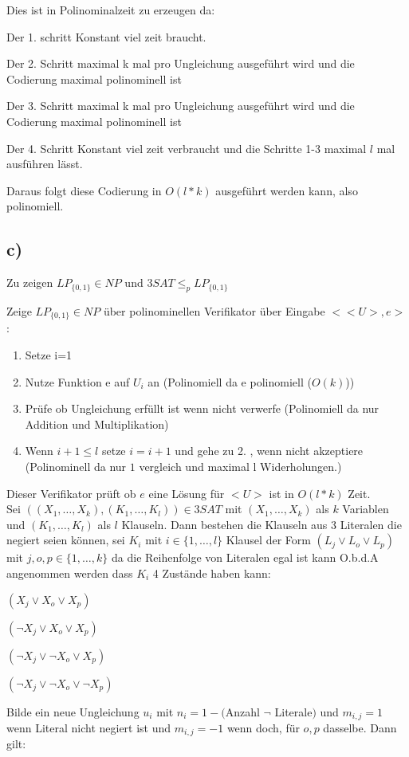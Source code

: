 Dies ist in Polinominalzeit zu erzeugen da:
\begin{list}{-}{}
\item Der 1. schritt Konstant viel zeit braucht.
\item Der 2. Schritt maximal k mal pro Ungleichung ausgeführt wird und die Codierung maximal polinominell ist 
\item Der 3. Schritt maximal k mal pro Ungleichung ausgeführt wird und die Codierung maximal polinominell ist 
\item Der 4. Schritt Konstant viel zeit verbraucht und die Schritte 1-3 maximal $l$ mal ausführen lässt.

\end{list}

 Daraus folgt diese Codierung in $O(l*k)$ ausgeführt werden kann, also polinomiell.
 
\subsection*{c)} 
Zu zeigen $LP_{\{0,1\}} \in NP$ und $3SAT \leq_p LP_{\{0,1\}}$

Zeige $LP_{\{0,1\}} \in NP$ über polinominellen Verifikator über Eingabe $<<U>,e>$:
\begin{enumerate}
\item Setze i=1
\item Nutze Funktion e auf $U_i$ an (Polinomiell da e polinomiell ($O(k)$))
\item Prüfe ob Ungleichung erfüllt ist wenn nicht verwerfe (Polinomiell da nur Addition und Multiplikation)
\item Wenn $i+1 \leq l$ setze $i=i+1$ und gehe zu 2. , wenn nicht akzeptiere (Polinominell da nur $1$ vergleich und maximal l Widerholungen.) 
\end{enumerate}
Dieser Verifikator prüft ob $e$ eine Lösung für $<U>$ ist in $O(l*k)$ Zeit.\\

Sei $((X_1,\ldots ,X_k),(K_1, \ldots , K_l)) \in 3SAT$ mit $(X_1,\ldots ,X_k)$ als $k$ Variablen und $(K_1, \ldots , K_l)$ als $l$ Klauseln. Dann bestehen die Klauseln aus 3 Literalen die negiert seien können, sei $K_i$ mit $i \in \{ 1, \ldots , l\}$ Klausel der Form $(L_j \vee L_o \vee L_p)$ mit $j,o,p \in \{ 1, \ldots , k\}$ da die Reihenfolge von Literalen egal ist kann O.b.d.A angenommen werden dass $K_i$ 4 Zustände haben kann:
\begin{list}{}{}
\item $(X_j \vee X_o \vee X_p)$
\item $( \neg X_j \vee X_o \vee X_p)$
\item $(\neg X_j \vee \neg X_o \vee X_p)$
\item $( \neg X_j \vee \neg X_o \vee \neg X_p)$
\end{list}
Bilde ein neue Ungleichung $u_i$ mit $n_i=1-($Anzahl $\neg$ Literale$)$ und $m_{i,j}=1$ wenn Literal nicht negiert ist und $m_{i,j}=-1$ wenn doch, für $o,p$ dasselbe.
Dann gilt:

